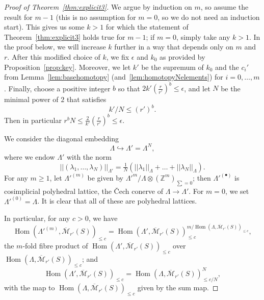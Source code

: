 \documentclass[11pt]{amsart}
\DeclareMathOperator{\Hom}{Hom}
\numberwithin{equation}{section}
\numberwithin{theorem}{section}
\theoremstyle{definition}
\begin{document}
\begin{proof}[Proof of Theorem~\ref{thm:explicit3}] We argue by induction on $m$, so assume the result for $m-1$ (this is no assumption for $m=0$, so we do not need an induction start). This gives us some $k>1$ for which the statement of Theorem~\ref{thm:explicit3} holds true for $m-1$; if $m=0$, simply take any $k>1$. In the proof below, we will increase $k$ further in a way that depends only on $m$ and $r$. After this modified choice of $k$, we fix $\epsilon$ and $k_0$ as provided by Proposition~\ref{prop:key}. Moreover, we let $k'$ be the supremum of $k_0$ and the $c_i'$ from Lemma~\ref{lem:basehomotopy} (and~\ref{lem:homotopyNelements}) for $i=0,\ldots,m$. Finally, choose a positive integer $b$ so that $2k'(\tfrac r{r'})^b\leq \epsilon$, and let $N$ be the minimal power of $2$ that satisfies
\[
k'/N\leq (r')^b.
\]
Then in particular $r^bN\leq \frac 2{k'}(\tfrac{r}{r'})^b\leq \epsilon$.

We consider the diagonal embedding
\[
\Lambda\hookrightarrow \Lambda' = \Lambda^N,
\]
where we endow $\Lambda'$ with the norm
\[
||(\lambda_1,\ldots,\lambda_N)||_{\Lambda'} = \tfrac 1N(||\lambda_1||_\Lambda+\ldots+||\lambda_N||_\Lambda).
\]
For any $m\geq 1$, let $\Lambda'^{(m)}$ be given by $\Lambda'^m / \Lambda\otimes (\mathbb Z^m)_{\sum=0}$; then $\Lambda'^{(\bullet)}$ is cosimplicial polyhedral lattice, the \v{C}ech conerve of $\Lambda\to \Lambda'$. For $m=0$, we set $\Lambda'^{(0)} = \Lambda$. It is clear that all of these are polyhedral lattices.

In particular, for any $c>0$, we have
\[
\Hom(\Lambda'^{(m)},\overline{\mathcal M}_{r'}(S))_{\leq c} = \Hom(\Lambda',\overline{\mathcal M}_{r'}(S))_{\leq c}^{m/\Hom(\Lambda,\overline{\mathcal M}_{r'}(S))_{\leq c}},
\]
the $m$-fold fibre product of $\Hom(\Lambda',\overline{\mathcal M}_{r'}(S))_{\leq c}$ over $\Hom(\Lambda,\overline{\mathcal M}_{r'}(S))_{\leq c}$; and
\[
\Hom(\Lambda',\overline{\mathcal M}_{r'}(S))_{\leq c} = \Hom(\Lambda,\overline{\mathcal M}_{r'}(S))_{\leq c/N}^N,
\]
with the map to $\Hom(\Lambda,\overline{\mathcal M}_{r'}(S))_{\leq c}$ given by the sum map.


\end{proof}
\end{document}
